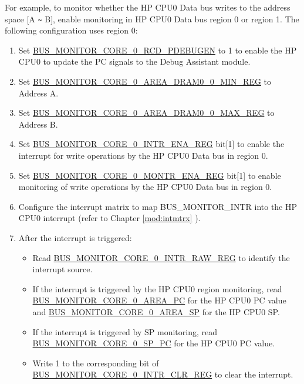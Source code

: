 \documentclass[main\_\_EN.tex]{subfiles}
\begin{document}
For example, to monitor whether the HP CPU0 Data bus writes to the address space [A \verb+~+ B], enable monitoring in HP CPU0 Data bus region 0 or region 1. The following configuration uses region 0:

\begin{enumerate}
    \item Set \hyperref[fielddesc:BUSMONITORCORE0RCDPDEBUGEN]{BUS\_MONITOR\_CORE\_0\_RCD\_PDEBUGEN} to 1 to enable the HP CPU0 to update the PC signals to the Debug Assistant module.
    \item Set \hyperref[regdesc:BUSMONITORCORE0AREADRAM00MINREG]{BUS\_MONITOR\_CORE\_0\_AREA\_DRAM0\_0\_MIN\_REG} to Address A.
    \item Set \hyperref[regdesc:BUSMONITORCORE0AREADRAM00MAXREG]{BUS\_MONITOR\_CORE\_0\_AREA\_DRAM0\_0\_MAX\_REG} to Address B.
    \item Set \hyperref[regdesc:BUSMONITORCORE0INTRENAREG]{BUS\_MONITOR\_CORE\_0\_INTR\_ENA\_REG} bit[1] to enable the interrupt for write operations by the HP CPU0 Data bus in region 0.
    \item Set \hyperref[regdesc:BUSMONITORCORE0MONTRENAREG]{BUS\_MONITOR\_CORE\_0\_MONTR\_ENA\_REG} bit[1] to enable monitoring of write operations by the HP CPU0 Data bus in region 0.
    \item Configure the interrupt matrix to map BUS\_MONITOR\_INTR into the HP CPU0 interrupt (refer to Chapter \ref{mod:intmtrx} \textit{}).
    \item After the interrupt is triggered:
        \begin{itemize}
            \item Read \hyperref[regdesc:BUSMONITORCORE0INTRRAWREG]{BUS\_MONITOR\_CORE\_0\_INTR\_RAW\_REG} to identify the interrupt source.
            \item If the interrupt is triggered by the HP CPU0 region monitoring, read \hyperref[fielddesc:BUSMONITORCORE0AREAPC]{BUS\_MONITOR\_CORE\_0\_AREA\_PC} for the HP CPU0 PC value and \hyperref[fielddesc:BUSMONITORCORE0AREASP]{BUS\_MONITOR\_CORE\_0\_AREA\_SP} for the HP CPU0 SP.
            \item If the interrupt is triggered by SP monitoring, read \hyperref[fielddesc:BUSMONITORCORE0SPPC]{BUS\_MONITOR\_CORE\_0\_SP\_PC} for the HP CPU0 PC value.
            \item Write 1 to the corresponding bit of \hyperref[regdesc:BUSMONITORCORE0INTRCLRREG]{BUS\_MONITOR\_CORE\_0\_INTR\_CLR\_REG} to clear the interrupt.
        \end{itemize}
\end{enumerate}
\end{document}
